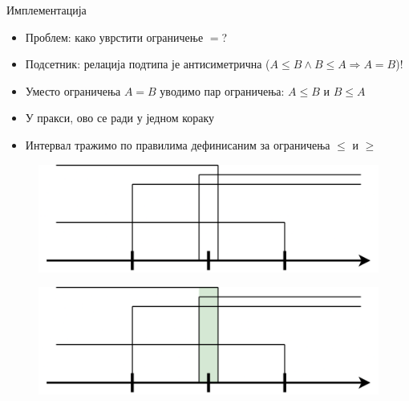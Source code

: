 \documentclass[xcolor=table]{beamer}
\begin{document}
\begin{frame}[allowframebreaks]{Имплементација}
        \framebreak
        
        \begin{itemize}
            \item Проблем: како уврстити ограничење \begin{math}=\end{math}?
            \item Подсетник: релација подтипа је антисиметрична (\begin{math}A \leq B \wedge B \leq A \Rightarrow A = B\end{math})!
            \item Уместо ограничења \begin{math}A = B\end{math} уводимо пар ограничења: \begin{math}A \leq B\end{math} и \begin{math}B \leq A\end{math}
            \item У пракси, ово се ради у једном кораку
            \item Интервал тражимо по правилима дефинисаним за ограничења \begin{math}\leq\end{math} и \begin{math}\geq\end{math}
        \end{itemize}
        
        \framebreak
        
        \begin{figure}
            \centering
            \includegraphics[width=\textwidth,height=0.8\textheight,keepaspectratio]{images/uni_int41.png}
        \end{figure}
        
        \framebreak
        
        \begin{figure}
            \centering
            \includegraphics[width=\textwidth,height=0.8\textheight,keepaspectratio]{images/uni_int42.png}
        \end{figure}
        

\end{frame}
\end{document}
